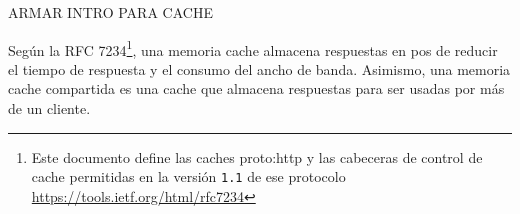
ARMAR INTRO PARA CACHE

Según la RFC 7234\footnote{Este documento define las caches \gls{proto:http} y las cabeceras de control de cache permitidas en la versión \texttt{1.1} de ese protocolo\\\url{https://tools.ietf.org/html/rfc7234}}, una memoria cache almacena respuestas en pos de reducir el tiempo de respuesta y el consumo del ancho de banda. Asimismo, una memoria cache compartida es una cache que almacena respuestas para ser usadas por más de un cliente.
